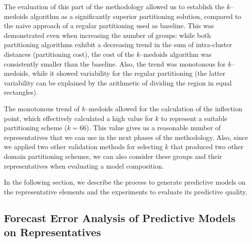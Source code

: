 The evaluation of this part of the methodology allowed us to establish the $k$--medoids algorithm as a significantly superior partitioning solution, compared to the naive approach of a regular partitioning used as baseline. This was demonstrated even when increasing the number of groups: while both partitioning algorithms exhibit a decreasing trend in the sum of intra-cluster distances (partitioning cost), the cost of the $k$--medoids algorithm was consistently smaller than the baseline. Also, the trend was monotonous for $k$--medoids, while it showed variability for the regular partitioning (the latter variability can be explained by the arithmetic of dividing the region in equal rectangles). 

The monotonous trend of $k$--medoids allowed for the calculation of the inflection point, which effectively calculated a high value for $k$ to represent a suitable partitioning scheme ($k = 66$). This value gives us a reasonable number of representatives that we can use in the next phases of the methodology. Also, since we applied two other validation methods for selecting $k$ that produced two other domain partitioning schemes, we can also consider these groups and their representatives when evaluating a model composition. 


In the following section, we describe the process to generate predictive models on the representative elements and the experiments to evaluate its predictive quality.

\subsection{Forecast Error Analysis of Predictive Models on Representatives}
\label{Sec:AnalyzePredictorRepresentatives}

